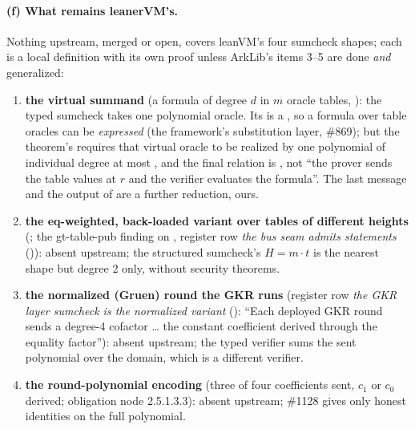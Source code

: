 \paragraph{(f) What remains leanerVM's.}
Nothing upstream, merged or open, covers leanVM's four sumcheck shapes; each is a local definition
with its own proof unless ArkLib's items 3--5 are done \emph{and} generalized:
\begin{enumerate}
\item \textbf{the virtual summand} (a formula of degree $d$ in $m$ oracle tables,
  ): the typed sumcheck takes one polynomial oracle. Its  is
  a , so a formula over table oracles can be \emph{expressed} (the framework's
  substitution layer, \#869); but the theorem's  requires that virtual oracle to
  be realized by one polynomial  of individual degree at most , and the final
  relation is , not ``the prover sends the table values at $r$ and the
  verifier evaluates the formula''. The last message and the  output of
   are a further reduction, ours.
\item \textbf{the eq-weighted, back-loaded variant over tables of different heights}
  (; the gt-table-pub finding on , register row \emph{the bus
  seam admits statements} ()): absent upstream; the structured sumcheck's
  $H = m \cdot t$ is the nearest shape but degree 2 only, without security theorems.
\item \textbf{the normalized (Gruen) round the GKR runs} (register row \emph{the GKR layer
  sumcheck is the normalized variant} (): ``Each deployed GKR round sends a degree-4
  cofactor \ldots{} the constant coefficient derived through the equality factor''): absent
  upstream; the typed verifier sums the sent polynomial over the domain, which is a different
  verifier.
\item \textbf{the round-polynomial encoding} (three of four coefficients sent, $c_1$ or $c_0$
  derived; obligation node 2.5.1.3.3): absent upstream; \#1128 gives only honest identities on
  the full polynomial.
\end{enumerate}

